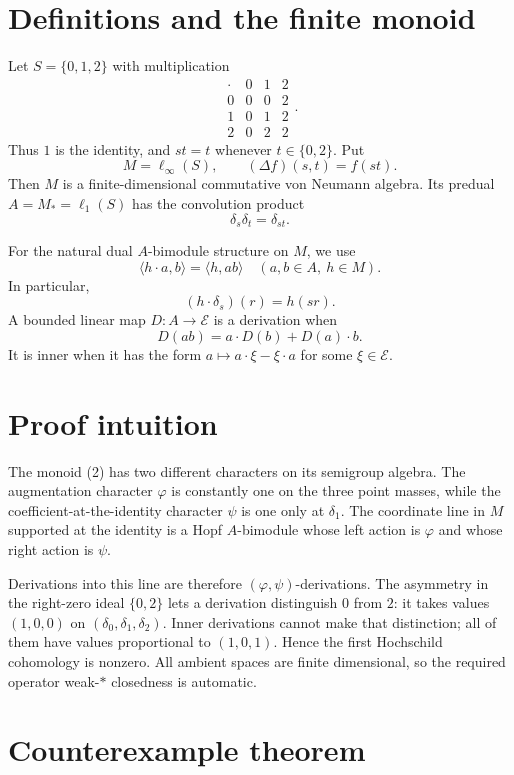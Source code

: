 \documentclass[11pt]{article}
\newcommand{\E}{\mathcal E}
\newcommand{\1}{\mathbf 1}
\begin{document}
\section{Definitions and the finite monoid}

Let $S=\{0,1,2\}$ with multiplication
\[
\begin{array}{c|ccc}
 \cdot&0&1&2\\ \hline
 0&0&0&2\\
 1&0&1&2\\
 2&0&2&2
\end{array}.
\tag{2}
\]
Thus $1$ is the identity, and $st=t$ whenever $t\in\{0,2\}$.
Put
\[
  M=\ell_\infty(S),
  \qquad
  (\Delta f)(s,t)=f(st).
\tag{3}
\]
Then $M$ is a finite-dimensional commutative von Neumann algebra.  Its
predual $A=M_*=\ell_1(S)$ has the convolution product
\[
  \delta_s\delta_t=\delta_{st}.
\tag{4}
\]

For the natural dual $A$-bimodule structure on $M$, we use
\[
 \langle h\mathbin{\cdot}a,b\rangle=\langle h,ab\rangle
 \quad(a,b\in A,\ h\in M).
\tag{5}
\]
In particular,
\[
  (h\mathbin{\cdot}\delta_s)(r)=h(sr).
\tag{6}
\]
A bounded linear map $D:A\to\E$ is a derivation when
\[
  D(ab)=a\mathbin{\cdot}D(b)+D(a)\mathbin{\cdot}b.
\tag{7}
\]
It is inner when it has the form
$a\mapsto a\mathbin{\cdot}\xi-\xi\mathbin{\cdot}a$ for some $\xi\in\E$.

\section{Proof intuition}

The monoid (2) has two different characters on its semigroup algebra.  The
augmentation character $\varphi$ is constantly one on the three point
masses, while the coefficient-at-the-identity character $\psi$ is one only
at $\delta_1$.  The coordinate line in $M$ supported at the identity is a
Hopf $A$-bimodule whose left action is $\varphi$ and whose right action is
$\psi$.

Derivations into this line are therefore $(\varphi,\psi)$-derivations.  The
asymmetry in the right-zero ideal $\{0,2\}$ lets a derivation distinguish
$0$ from $2$: it takes values $(1,0,0)$ on
$(\delta_0,\delta_1,\delta_2)$.  Inner derivations cannot make that
distinction; all of them have values proportional to $(1,0,1)$.  Hence the
first Hochschild cohomology is nonzero.  All ambient spaces are finite
dimensional, so the required operator weak-$*$ closedness is automatic.

\section{Counterexample theorem}
\end{document}
